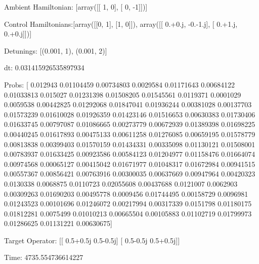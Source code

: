 \documentclass{article}
\begin{document}
    

\newpage

Ambient Hamiltonian: [array([[ 1,  0],
       [ 0, -1]])]

Control Hamiltonians:[array([[0, 1],
       [1, 0]]), array([[ 0.+0.j, -0.-1.j],
       [ 0.+1.j,  0.+0.j]])]

Detunings: [(0.001, 1), (0.001, 2)]

 dt: 0.031415926535897934

Probs: [ 0.012943    0.01104459  0.00734803  0.0029584   0.01171643  0.00684122
  0.01033813  0.015027    0.01231398  0.01508205  0.01545561  0.0119371
  0.0001029   0.0059538   0.00442825  0.01292068  0.01847041  0.01936244
  0.00381028  0.00137703  0.01573239  0.01610028  0.01926359  0.01423146
  0.01516653  0.00630383  0.01730406  0.01633745  0.00797087  0.01086665
  0.00273779  0.00672939  0.01389398  0.01698225  0.00440245  0.01617893
  0.00475133  0.00611258  0.01276085  0.00659195  0.01578779  0.00813838
  0.00399403  0.01570159  0.01434331  0.00335098  0.01130121  0.01508001
  0.00783937  0.01633425  0.00923586  0.00584123  0.01204977  0.01158476
  0.01664074  0.00974568  0.00065127  0.00415042  0.01671977  0.01048317
  0.01672984  0.00941515  0.00557367  0.00856421  0.00763916  0.00300035
  0.00637669  0.00947964  0.00420323  0.0130338   0.0068875   0.0110723
  0.02055608  0.00437688  0.0121007   0.0062903   0.00309263  0.01690203
  0.00495778  0.0009456   0.01744495  0.00158729  0.0096981   0.01243523
  0.00101696  0.01246072  0.00217994  0.00317339  0.0151798   0.01180175
  0.01812281  0.0075499   0.01010213  0.00665504  0.00105883  0.01102719
  0.01799973  0.01286625  0.01131221  0.00630675]

Target Operator: [[ 0.5+0.5j  0.5-0.5j]
 [ 0.5-0.5j  0.5+0.5j]]

Time: 4735.554736614227
\end{document}
